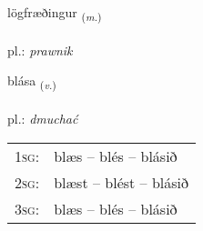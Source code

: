 \documentclass[frontgrid, backgrid]{flacards}\usepackage[]{graphicx}\usepackage[]{xcolor}
\begin{document}
\renewcommand{\flhead}{\vskip5pt \fboxsep=0pt {\small\bfseries\footnotesize Nafnorð | rzeczownik}}
\renewcommand{\fcfoot}{\vskip5pt \fboxsep=0pt \hspace{2pt}{\small\bfseries\footnotesize 3K}}

\renewcommand{\blhead}{\vskip5pt {\small\bfseries\footnotesize Nafnorð | rzeczownik }}
\renewcommand{\bcfoot}{\vskip5pt \hspace{2pt}{\small\bfseries\footnotesize 3K}}


{lögfræðingur \small{\textsubscript{(\textit{m.})}} \\[1ex] %
\textphonetic{[lœxfraiðiŋkʏr]} \\
pl.: \emph{prawnik} \\  [2ex]
\renewcommand*{\arraystretch}{0.8}
}

\renewcommand{\flhead}{\vskip5pt \fboxsep=0pt {\small\bfseries\footnotesize Sagnorð | czasownik}}
\renewcommand{\fcfoot}{\vskip5pt \fboxsep=0pt \hspace{2pt}{\small\bfseries\footnotesize 3K}}

\renewcommand{\blhead}{\vskip5pt {\small\bfseries\footnotesize Sagnorð | czasownik }}
\renewcommand{\bcfoot}{\vskip5pt \hspace{2pt}{\small\bfseries\footnotesize 3K}}


{blása \small{\textsubscript{(\textit{v.})}} \\[1ex] %
\textphonetic{[plauːsa]} \\
pl.: \emph{dmuchać} \\  [2ex]
\renewcommand*{\arraystretch}{0.8}
\begin{tabular}{p{1cm}l}
\textsc{1sg}: & blæs -- blés -- blásið \\ 
\textsc{2sg}: & blæst -- blést -- blásið \\ 
\textsc{3sg}: & blæs -- blés -- blásið \\ 
\end{tabular}
}
\end{document}
